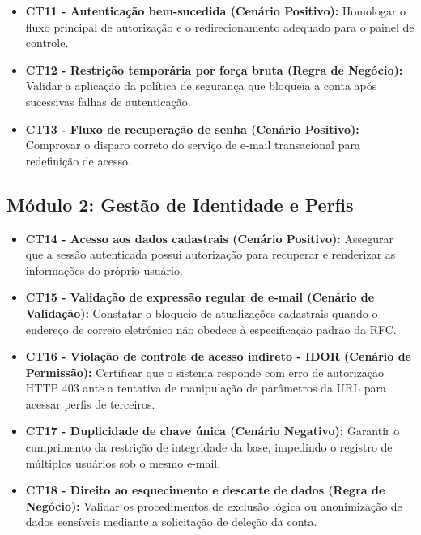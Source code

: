 \documentclass[12pt,a4paper]{article}
\begin{document}
\begin{itemize}[leftmargin=*]
    \item \textbf{CT11 - Autenticação bem-sucedida (Cenário Positivo):} Homologar o fluxo principal de autorização e o redirecionamento adequado para o painel de controle.
    \item \textbf{CT12 - Restrição temporária por força bruta (Regra de Negócio):} Validar a aplicação da política de segurança que bloqueia a conta após sucessivas falhas de autenticação.
    \item \textbf{CT13 - Fluxo de recuperação de senha (Cenário Positivo):} Comprovar o disparo correto do serviço de e-mail transacional para redefinição de acesso.
\end{itemize}

\subsection{Módulo 2: Gestão de Identidade e Perfis}
\begin{itemize}[leftmargin=*]
    \item \textbf{CT14 - Acesso aos dados cadastrais (Cenário Positivo):} Assegurar que a sessão autenticada possui autorização para recuperar e renderizar as informações do próprio usuário.
    \item \textbf{CT15 - Validação de expressão regular de e-mail (Cenário de Validação):} Constatar o bloqueio de atualizações cadastrais quando o endereço de correio eletrônico não obedece à especificação padrão da RFC.
    \item \textbf{CT16 - Violação de controle de acesso indireto - IDOR (Cenário de Permissão):} Certificar que o sistema responde com erro de autorização HTTP 403 ante a tentativa de manipulação de parâmetros da URL para acessar perfis de terceiros.
    \item \textbf{CT17 - Duplicidade de chave única (Cenário Negativo):} Garantir o cumprimento da restrição de integridade da base, impedindo o registro de múltiplos usuários sob o mesmo e-mail.
    \item \textbf{CT18 - Direito ao esquecimento e descarte de dados (Regra de Negócio):} Validar os procedimentos de exclusão lógica ou anonimização de dados sensíveis mediante a solicitação de deleção da conta.
\end{itemize}
\end{document}
